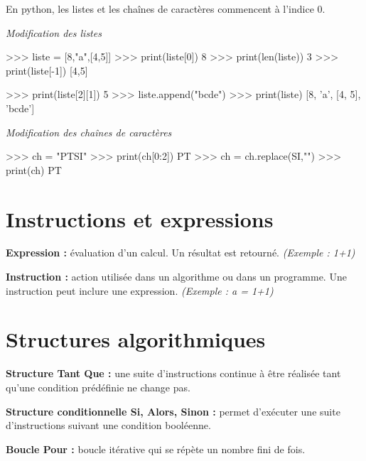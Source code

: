 \documentclass[10pt]{article}
\begin{document}
\begin{exemple}
En python, les listes et les chaînes de caractères commencent à l'indice 0. 

\begin{minipage}[t]{.23\linewidth}
\noindent \textit{Modification des listes}
\begin{python}
>>> liste = [8,"a",[4,5]]
>>> print(liste[0])
            8
>>> print(len(liste))
            3
>>> print(liste[-1])
            [4,5]
\end{python}
\end{minipage} 
\begin{minipage}[t]{.3\linewidth}
\begin{python}
>>> print(liste[2][1])
            5
>>> liste.append("bcde")
>>> print(liste)
            [8, 'a', [4, 5], 'bcde']
\end{python}
\end{minipage} \hfill
\begin{minipage}[t]{.45\linewidth}
\noindent \textit{Modification des chaînes de caractères}
\begin{python}
>>> ch = "PTSI"
>>> print(ch[0:2])
            PT
>>> ch = ch.replace(SI,"")
>>> print(ch)
            PT
\end{python}
\end{minipage} 
\end{exemple}
\section{Instructions et expressions}

\begin{defi}
\textbf{Expression :} évaluation d’un calcul. Un résultat est retourné. \textit{(Exemple : 1+1)}

\textbf{Instruction :} action utilisée dans un algorithme ou dans un programme. Une instruction peut inclure une expression. \textit{(Exemple : a = 1+1)}
\end{defi}
\newpage

\section{Structures algorithmiques}
\begin{defi}
\begin{minipage}[t]{.32\linewidth}
\noindent \textbf{Structure Tant Que :} une suite d'instructions continue à être réalisée tant qu'une condition prédéfinie ne change pas.
\end{minipage} \hfill
\begin{minipage}[t]{.32\linewidth}
\noindent \textbf{Structure conditionnelle Si, Alors, Sinon :} permet d'exécuter une suite d'instructions suivant une condition booléenne.
\end{minipage} \hfill
\begin{minipage}[t]{.32\linewidth}
\noindent \textbf{Boucle Pour :}  boucle itérative qui se répète un nombre fini de fois.
\end{minipage} 
\end{defi}
\end{document}
